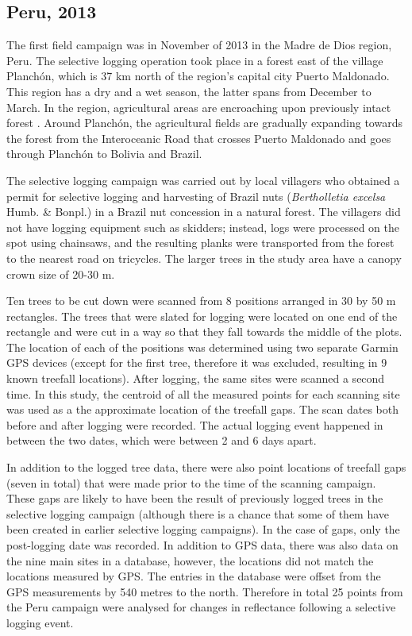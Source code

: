 \documentclass[a4paper,12pt]{scrbook}
\begin{document}
\subsection{Peru, 2013}

The first field campaign was in November of 2013 in the Madre de Dios region, Peru. The selective logging operation took place in a forest east of the village Planchón, which is 37 km north of the region's capital city Puerto Maldonado. This region has a dry and a wet season, the latter spans from December to March. In the region, agricultural areas are encroaching upon previously intact forest \citep{scullion_assessing_2014}. Around Planchón, the agricultural fields are gradually expanding towards the forest from the Interoceanic Road that crosses Puerto Maldonado and goes through Planchón to Bolivia and Brazil.

The selective logging campaign was carried out by local villagers who obtained a permit for selective logging and harvesting of Brazil nuts (\textit{Bertholletia excelsa} Humb. \& Bonpl.) in a Brazil nut concession in a natural forest. The villagers did not have logging equipment such as skidders; instead, logs were processed on the spot using chainsaws, and the resulting planks were transported from the forest to the nearest road on tricycles. The larger trees in the study area have a canopy crown size of 20-30 m.

Ten trees to be cut down were scanned from 8 positions arranged in 30 by 50 m rectangles. The trees that were slated for logging were located on one end of the rectangle and were cut in a way so that they fall towards the middle of the plots. The location of each of the positions was determined using two separate Garmin \ac{GPS} devices (except for the first tree, therefore it was excluded, resulting in 9 known treefall locations). After logging, the same sites were scanned a second time. In this study, the centroid of all the measured points for each scanning site was used as a the approximate location of the treefall gaps. The scan dates both before and after logging were recorded. The actual logging event happened in between the two dates, which were between 2 and 6 days apart.

In addition to the logged tree data, there were also point locations of treefall gaps (seven in total) that were made prior to the time of the scanning campaign. These gaps are likely to have been the result of previously logged trees in the selective logging campaign (although there is a chance that some of them have been created in earlier selective logging campaigns). In the case of gaps, only the post-logging date was recorded. In addition to \ac{GPS} data, there was also data on the nine main sites in a database, however, the locations did not match the locations measured by GPS. The entries in the database were offset from the GPS measurements by 540 metres to the north. Therefore in total 25 points from the Peru campaign were analysed for changes in reflectance following a selective logging event.
\end{document}
